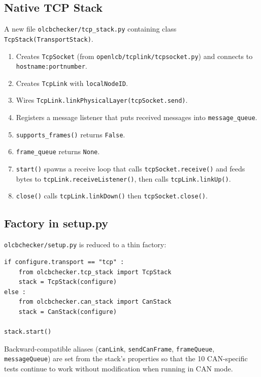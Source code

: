 \subsection{Native TCP Stack}

A new file \texttt{olcbchecker/tcp\_stack.py} containing class
\texttt{TcpStack(TransportStack)}.

\begin{enumerate}
\item Creates \texttt{TcpSocket} (from \texttt{openlcb/tcplink/tcpsocket.py})
    and connects to \texttt{hostname:portnumber}.
\item Creates \texttt{TcpLink} with \texttt{localNodeID}.
\item Wires \texttt{TcpLink.linkPhysicalLayer(tcpSocket.send)}.
\item Registers a message listener that puts received messages into
    \texttt{message\_queue}.
\item \texttt{supports\_frames()} returns \texttt{False}.
\item \texttt{frame\_queue} returns \texttt{None}.
\item \texttt{start()} spawns a receive loop that calls
    \texttt{tcpSocket.receive()} and feeds bytes to
    \texttt{tcpLink.receiveListener()}, then calls \texttt{tcpLink.linkUp()}.
\item \texttt{close()} calls \texttt{tcpLink.linkDown()} then
    \texttt{tcpSocket.close()}.
\end{enumerate}

\subsection{Factory in setup.py}

\texttt{olcbchecker/setup.py} is reduced to a thin factory:

\begin{verbatim}
if configure.transport == "tcp" :
    from olcbchecker.tcp_stack import TcpStack
    stack = TcpStack(configure)
else :
    from olcbchecker.can_stack import CanStack
    stack = CanStack(configure)

stack.start()
\end{verbatim}

Backward-compatible aliases (\texttt{canLink}, \texttt{sendCanFrame},
\texttt{frameQueue}, \texttt{messageQueue}) are set from the stack's
properties so that the 10 CAN-specific tests continue to work without
modification when running in CAN mode.

